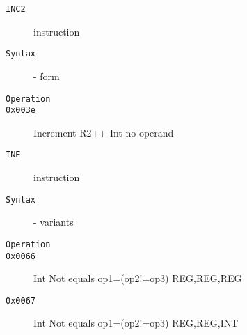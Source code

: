 \clearpage
\begin{description}
\item[\texttt{INC2}] instruction\\
\item[\texttt{Syntax}] - form \\

\item[\texttt{Operation}]
\item[\texttt{}]
\item[\texttt{0x003e}] Increment R2++ Int  no operand          \\
\end{description}
\clearpage
\begin{description}
\item[\texttt{INE}] instruction\\
\item[\texttt{Syntax}] - variants\\

\item[\texttt{Operation}]
\item[\texttt{}]
\item[\texttt{0x0066}] Int Not equals op1=(op2!=op3)  {REG,REG,REG}       \\
\item[\texttt{0x0067}] Int Not equals op1=(op2!=op3)  {REG,REG,INT}       \\
\end{description}
\clearpage
